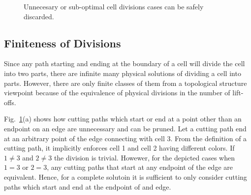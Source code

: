 \documentclass[journal]{IEEEtran}
\begin{document}
\begin{figure}[t]
\centering
{}
\caption{Unnecesary or sub-optimal cell divisions cases can be safely discarded.}
\label{figproof}
\end{figure}

\subsection{Finiteness of Divisions}
\label{subsectionproof}
Since any path starting and ending at the boundary of a cell will divide the cell into two parts, there are infinite many physical solutions of dividing a cell into parts. However, there are only finite classes of them from a topological structure viewpoint 
because of the equivalence of physical divisions in the number of lift-offs. 

Fig.~\ref{figproof}(a) shows how cutting paths which start or end at a point other than an endpoint on an edge are unnecessary and can be pruned. Let a cutting path end at an arbitrary point of the edge connecting with cell 3. From the definition of a cutting path, it implicitly enforces cell 1 and cell 2 having different colors.  
If $1\neq 3$ and $2\neq 3$ the division is trivial. 
Howewer, for the depicted cases when $1=3$ or $2=3$, any cutting paths that start at any endpoint of the edge are equivalent. Hence, for a complete solutoin it is sufficient to only consider cutting paths which start and end at the endpoint of and edge.  
\end{document}
